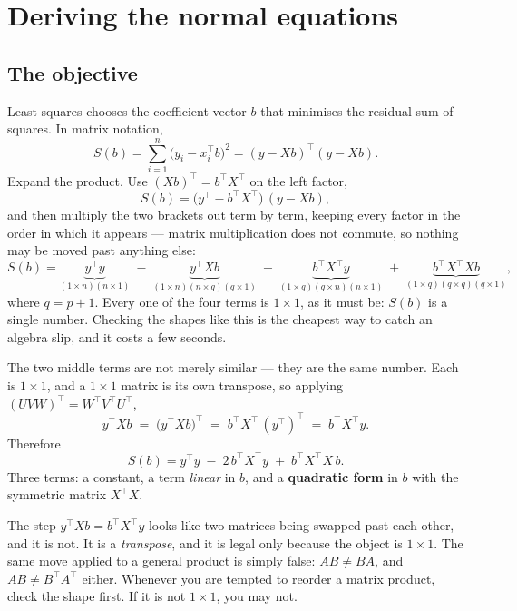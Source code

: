 \documentclass[11pt]{article}
\newcommand{\Xt}{X^{\!\top}}
\begin{document}
\section{Deriving the normal equations}
\label{sec:derive}

\subsection{The objective}

Least squares chooses the coefficient vector $b$ that minimises the residual
sum of squares. In matrix notation,
\begin{equation}
  \label{eq:objective}
  S(b) = \sum_{i=1}^{n}\bigl(y_i - x_i^{\!\top}b\bigr)^2
       = (y - Xb)^{\!\top}(y - Xb).
\end{equation}
Expand the product. Use $(Xb)^{\!\top} = b^{\!\top}\Xt$ on the left factor,
\[
  S(b) = \bigl(y^{\!\top} - b^{\!\top}\Xt\bigr)\,(y - Xb),
\]
and then multiply the two brackets out term by term, keeping every factor in
the order in which it appears --- matrix multiplication does not commute, so
nothing may be moved past anything else:
\[
  S(b) = \underbrace{y^{\!\top}y}_{(1\times n)(n\times 1)}
       \;-\; \underbrace{y^{\!\top}Xb}_{(1\times n)(n\times q)(q\times 1)}
       \;-\; \underbrace{b^{\!\top}\Xt y}_{(1\times q)(q\times n)(n\times 1)}
       \;+\; \underbrace{b^{\!\top}\Xt X b}_{(1\times q)(q\times q)(q\times 1)},
\]
where $q = p+1$. Every one of the four terms is $1\times1$, as it must be:
$S(b)$ is a single number. Checking the shapes like this is the cheapest way
to catch an algebra slip, and it costs a few seconds.

The two middle terms are not merely similar --- they are the same number.
Each is $1\times1$, and a $1\times1$ matrix is its own transpose, so applying
$(UVW)^{\!\top} = W^{\!\top}V^{\!\top}U^{\!\top}$,
\[
  y^{\!\top}Xb \;=\; \bigl(y^{\!\top}Xb\bigr)^{\!\top}
               \;=\; b^{\!\top}\Xt\,(y^{\!\top})^{\!\top}
               \;=\; b^{\!\top}\Xt y .
\]
Therefore
\begin{equation}
  \label{eq:expanded}
  S(b) = y^{\!\top}y \;-\; 2\,b^{\!\top}\Xt y \;+\; b^{\!\top}\Xt X\,b .
\end{equation}
Three terms: a constant, a term \emph{linear} in $b$, and a \textbf{quadratic
form} in $b$ with the symmetric matrix $\Xt X$.

\begin{caution}
The step $y^{\!\top}Xb = b^{\!\top}\Xt y$ looks like two matrices being
swapped past each other, and it is not. It is a \emph{transpose}, and it is
legal only because the object is $1\times1$. The same move applied to a
general product is simply false: $AB \ne BA$, and $AB \ne B^{\!\top}A^{\!\top}$
either. Whenever you are tempted to reorder a matrix product, check the shape
first. If it is not $1\times1$, you may not.
\end{caution}
\end{document}

